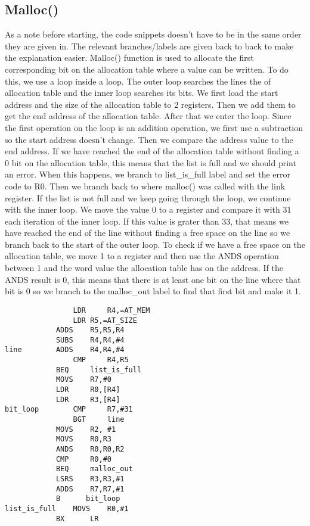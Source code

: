 \documentclass[pdftex,12pt,a4paper]{article}
\begin{document}
\subsection{Malloc()}
As a note before starting, the code snippets doesn't have to be in the same order they are given in. The relevant branches/labels are given back to back to make the explanation easier.
Malloc() function is used to allocate the first corresponding bit on the allocation table where a value can be written. To do this, we use a loop inside a loop. The outer loop searches the lines the of allocation table and the inner loop searches its bits. We first load the start address and the size of the allocation table to 2 registers. Then we add them to get the end address of the allocation table. After that we enter the loop. Since the first operation on the loop is an addition operation, we first use a subtraction so the start address doesn't change. Then we compare the address value to the end address. If we have reached the end of the allocation table without finding a 0 bit on the allocation table, this means that the list is full and we should print an error. When this happens, we branch to list\_is\_full label and set the error code to R0. Then we branch back to where malloc() was called with the link register. If the list is not full and we keep going through the loop, we continue with the inner loop. We move the value 0 to a register and compare it with 31 each iteration of the inner loop. If this value is grater than 33, that means we have reached the end of the line without finding a free space on the line so we branch back to the start of the outer loop. To check if we have a free space on the allocation table, we move 1 to a register and then use the ANDS operation between 1 and the word value the allocation table has on the address. If the ANDS result is 0, this means that there is at least one bit on the line where that bit is 0 so we branch to the malloc\_out label to find that first bit and make it 1.

\begin{lstlisting}
                LDR     R4,=AT_MEM					
                LDR	R5,=AT_SIZE					
        	ADDS    R5,R5,R4					
        	SUBS    R4,R4,#4					
line    	ADDS    R4,R4,#4					
    	        CMP     R4,R5						
           	BEQ     list_is_full					
        	MOVS    R7,#0						
        	LDR     R0,[R4]						
        	LDR     R3,[R4]					
bit_loop        CMP     R7,#31						
    	        BGT     line						
        	MOVS    R2, #1						
        	MOVS    R0,R3						
        	ANDS    R0,R0,R2					
        	CMP     R0,#0						
        	BEQ     malloc_out					
        	LSRS    R3,R3,#1					
        	ADDS    R7,R7,#1					
        	B      bit_loop
list_is_full	MOVS    R0,#1					
        	BX      LR							
\end{lstlisting}
\end{document}
